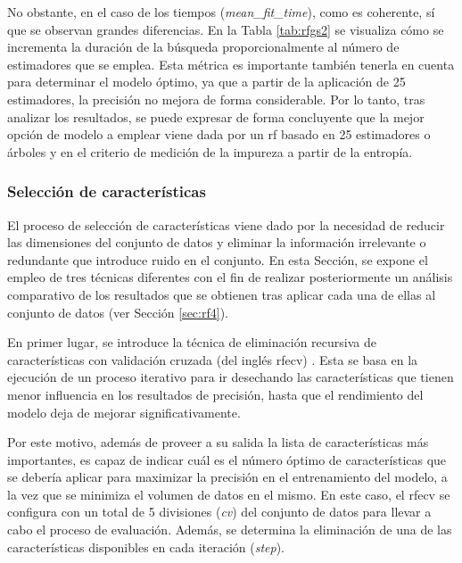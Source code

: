 No obstante, en el caso de los tiempos (\textit{mean\_fit\_time}), como es coherente, sí que se observan grandes diferencias. En la Tabla \ref{tab:rfgs2} se visualiza cómo se incrementa la duración de la búsqueda proporcionalmente al número de estimadores que se emplea. Esta métrica es importante también tenerla en cuenta para determinar el modelo óptimo, ya que a partir de la aplicación de 25 estimadores, la precisión no mejora de forma considerable. Por lo tanto, tras analizar los resultados, se puede expresar de forma concluyente que la mejor opción de modelo a emplear viene dada por un \gls{rf} basado en 25 estimadores o árboles y en el criterio de medición de la impureza a partir de la entropía.

\subsubsection{Selección de características}
\label{sec:rf3}

El proceso de selección de características viene dado por la necesidad de reducir las dimensiones del conjunto de datos y eliminar la información irrelevante o redundante que introduce ruido en el conjunto. En esta Sección, se expone el empleo de tres técnicas diferentes con el fin de realizar posteriormente un análisis comparativo de los resultados que se obtienen tras aplicar cada una de ellas al conjunto de datos (ver Sección \ref{sec:rf4}).

\vspace{3mm}

En primer lugar, se introduce la técnica de eliminación recursiva de características con validación cruzada (del inglés \gls{rfecv}) \cite{rfecv}. Esta se basa en la ejecución de un proceso iterativo para ir desechando las características que tienen menor influencia en los resultados de precisión, hasta que el rendimiento del modelo deja de mejorar significativamente. 

\vspace{3mm}

Por este motivo, además de proveer a su salida la lista de características más importantes, es capaz de indicar cuál es el número óptimo de características que se debería aplicar para maximizar la precisión en el entrenamiento del modelo, a la vez que se minimiza el volumen de datos en el mismo. En este caso, el \gls{rfecv} se configura con un total de 5 divisiones (\textit{cv}) del conjunto de datos para llevar a cabo el proceso de evaluación. Además, se determina la eliminación de una de las características disponibles en cada iteración (\textit{step}). 


